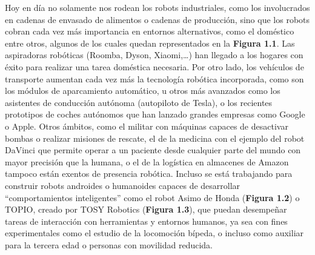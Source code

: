 Hoy en día no solamente nos rodean los robots industriales, como los involucrados en cadenas de envasado de alimentos o cadenas de producción, sino que los robots cobran cada vez más importancia en entornos alternativos, como el doméstico entre otros, algunos de los cuales quedan representados en la \textbf{Figura 1.1}. Las aspiradoras robóticas (Roomba, Dyson, Xiaomi,…) han llegado a los hogares con éxito para realizar una tarea doméstica necesaria. Por otro lado, los vehículos de transporte aumentan cada vez más la tecnología robótica incorporada, como son los módulos de aparcamiento automático, u otros más avanzados como los asistentes de conducción autónoma (autopiloto de Tesla), o los recientes prototipos de coches autónomos que han lanzado grandes empresas como Google o Apple. Otros ámbitos, como el militar con máquinas capaces de desactivar bombas o realizar misiones de rescate, el de la medicina con el ejemplo del robot DaVinci que permite operar a un paciente desde cualquier parte del mundo con mayor precisión que la humana, o el de la logística en almacenes de Amazon tampoco están exentos de presencia robótica. Incluso se está trabajando para construir robots androides o humanoides capaces de desarrollar “comportamientos inteligentes” como el robot Asimo de Honda (\textbf{Figura 1.2}) o TOPIO, creado por TOSY Robotics (\textbf{Figura 1.3}), que puedan desempeñar tareas de interacción con herramientas y entornos humanos, ya sea con fines experimentales como el estudio de la locomoción bípeda, o incluso como auxiliar para la tercera edad o personas con movilidad reducida.

